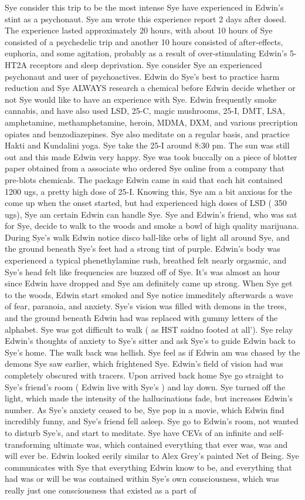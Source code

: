 \documentclass[12pt]{book}
\begin{document}
Sye consider this trip to be the most intense Sye have experienced in Edwin's stint as a psychonaut. Sye am wrote this experience report 2 days after dosed. The experience lasted approximately 20 hours, with about 10 hours of Sye consisted of a psychedelic trip and another 10 hours consisted of after-effects, euphoria, and some agitation, probably as a result of over-stimulating Edwin's 5-HT2A receptors and sleep deprivation. Sye consider Sye an experienced psychonaut and user of psychoactives. Edwin do Sye's best to practice harm reduction and Sye ALWAYS research a chemical before Edwin decide whether or not Sye would like to have an experience with Sye. Edwin frequently smoke cannabis, and have also used LSD, 25-C, magic mushrooms, 25-I, DMT, LSA, amphetamine, methamphetamine, heroin, MDMA, DXM, and various precription opiates and benzodiazepines. Sye also meditate on a regular basis, and practice Hakti and Kundalini yoga. Sye take the 25-I around 8:30 pm. The sun was still out and this made Edwin very happy. Sye was took buccally on a piece of blotter paper obtained from a associate who ordered Sye online from a company that pre-blots chemicals. The package Edwin came in said that each hit contained 1200 ugs, a pretty high dose of 25-I. Knowing this, Sye am a bit anxious for the come up when the onset started, but had experienced high doses of LSD ( 350 ugs), Sye am certain Edwin can handle Sye. Sye and Edwin's friend, who was sat for Sye, decide to walk to the woods and smoke a bowl of high quality marijuana. During Sye's walk Edwin notice disco ball-like orbs of light all around Sye, and the ground beneath Sye's feet had a strong tint of purple. Edwin's body was experienced a typical phenethylamine rush, breathed felt nearly orgasmic, and Sye's head felt like frequencies are buzzed off of Sye. It's was almost an hour since Edwin have dropped and Sye am definitely came up strong. When Sye get to the woods, Edwin start smoked and Sye notice immeditely afterwards a wave of fear, paranoia, and anxiety. Sye's vision was filled with demons in the trees, and the ground beneath Edwin had was replaced with gummy letters of the alphabet. Sye was got difficult to walk ( as HST saidno footed at all'). Sye relay Edwin's thoughts of anxiety to Sye's sitter and ask Sye's to guide Edwin back to Sye's home. The walk back was hellish. Sye feel as if Edwin am was chased by the demons Sye saw earlier, which frightened Sye. Edwin's field of vision had was completely obscured with tracers. Upon arrived back home Sye go straight to Sye's friend's room ( Edwin live with Sye's ) and lay down. Sye turned off the light, which made the intensity of the hallucinations fade, but increases Edwin's number. As Sye's anxiety ceased to be, Sye pop in a movie, which Edwin find incredibly funny, and Sye's friend fell asleep. Sye go to Edwin's room, not wanted to disturb Sye's, and start to meditate. Sye have CEVs of an infinite and self-transforming ultimate was, which contained everything that ever was, was and will ever be. Edwin looked eerily similar to Alex Grey's painted Net of Being. Sye communicates with Sye that everything Edwin know to be, and everything that had was or will be was contained within Sye's own consciousness, which was really just one consciousness that existed as a part of 
\end{document}
